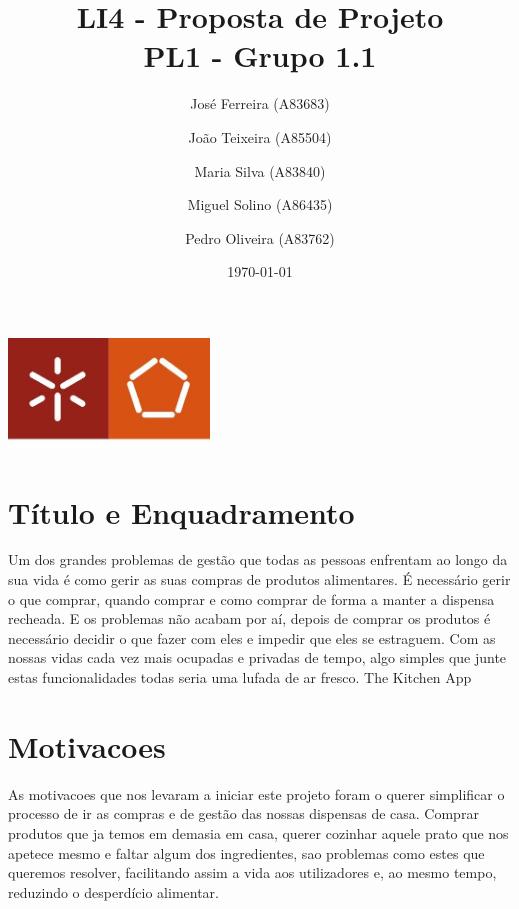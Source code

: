 \documentclass[a4paper]{report}
\begin{document}
\title{LI4 - Proposta de Projeto\\ 
\large PL1 - Grupo 1.1}
\author{José Ferreira (A83683) \and João Teixeira (A85504) \and Maria Silva
(A83840) \and Miguel Solino (A86435) \and Pedro Oliveira (A83762)}
\date{\today}

\begin{center}
    \begin{minipage}{0.75\linewidth}
        \centering
        \includegraphics[width=0.4\textwidth]{images/eng.jpeg}\par\vspace{1cm}
        \vspace{1.5cm}
        \href{https://www.uminho.pt/PT}
        {\color{black}{\scshape\LARGE Universidade do Minho}} \par
        \vspace{1cm}
        \href{https://www.di.uminho.pt/}
        {\color{black}{\scshape\Large Departamento de Informática}} \par
        \vspace{1.5cm}
        \maketitle
    \end{minipage}
\end{center}

\pagebreak
\section{Título e Enquadramento}
Um dos grandes problemas de gestão que todas as pessoas enfrentam ao longo da
sua vida é como gerir as suas compras de produtos alimentares. É necessário
gerir o que comprar, quando comprar e como comprar de forma a manter a dispensa
recheada. E os problemas não acabam por aí, depois de comprar os produtos é
necessário decidir o que fazer com eles e impedir que eles se estraguem. Com as
nossas vidas cada vez mais ocupadas e privadas de tempo, algo simples que junte
estas funcionalidades todas seria uma lufada de ar fresco.
The Kitchen App

\section{Motivacoes}
As motivacoes que nos levaram a iniciar este projeto foram o querer simplificar
o processo de ir as compras e de gestão das nossas dispensas de casa.
Comprar produtos que ja temos em demasia em casa, querer cozinhar aquele prato
que nos apetece mesmo e faltar algum dos ingredientes, sao problemas como estes
que queremos resolver, facilitando assim a vida aos utilizadores e, 
ao mesmo tempo, reduzindo o desperdício alimentar.
\end{document}

